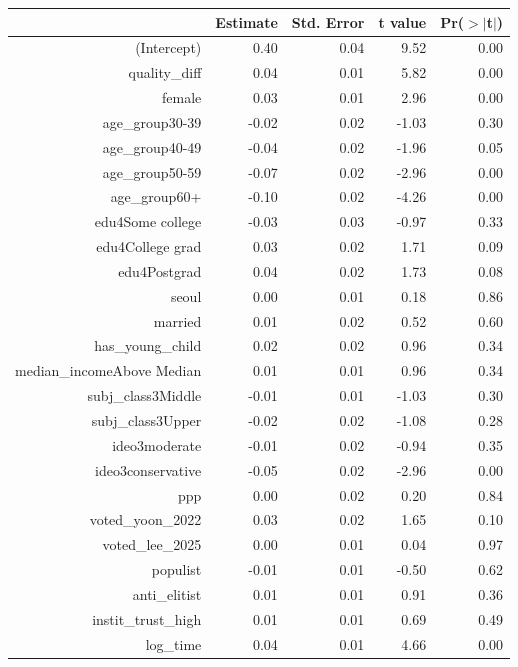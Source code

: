 \begin{tabular}{rrrrr}
  \toprule
 & Estimate & Std. Error & t value & Pr($>$$|$t$|$) \\ 
  \midrule
(Intercept) & 0.40 & 0.04 & 9.52 & 0.00 \\ 
  quality\_diff & 0.04 & 0.01 & 5.82 & 0.00 \\ 
  female & 0.03 & 0.01 & 2.96 & 0.00 \\ 
  age\_group30-39 & -0.02 & 0.02 & -1.03 & 0.30 \\ 
  age\_group40-49 & -0.04 & 0.02 & -1.96 & 0.05 \\ 
  age\_group50-59 & -0.07 & 0.02 & -2.96 & 0.00 \\ 
  age\_group60+ & -0.10 & 0.02 & -4.26 & 0.00 \\ 
  edu4Some college & -0.03 & 0.03 & -0.97 & 0.33 \\ 
  edu4College grad & 0.03 & 0.02 & 1.71 & 0.09 \\ 
  edu4Postgrad & 0.04 & 0.02 & 1.73 & 0.08 \\ 
  seoul & 0.00 & 0.01 & 0.18 & 0.86 \\ 
  married & 0.01 & 0.02 & 0.52 & 0.60 \\ 
  has\_young\_child & 0.02 & 0.02 & 0.96 & 0.34 \\ 
  median\_incomeAbove Median & 0.01 & 0.01 & 0.96 & 0.34 \\ 
  subj\_class3Middle & -0.01 & 0.01 & -1.03 & 0.30 \\ 
  subj\_class3Upper & -0.02 & 0.02 & -1.08 & 0.28 \\ 
  ideo3moderate & -0.01 & 0.02 & -0.94 & 0.35 \\ 
  ideo3conservative & -0.05 & 0.02 & -2.96 & 0.00 \\ 
  ppp & 0.00 & 0.02 & 0.20 & 0.84 \\ 
  voted\_yoon\_2022 & 0.03 & 0.02 & 1.65 & 0.10 \\ 
  voted\_lee\_2025 & 0.00 & 0.01 & 0.04 & 0.97 \\ 
  populist & -0.01 & 0.01 & -0.50 & 0.62 \\ 
  anti\_elitist & 0.01 & 0.01 & 0.91 & 0.36 \\ 
  instit\_trust\_high & 0.01 & 0.01 & 0.69 & 0.49 \\ 
  log\_time & 0.04 & 0.01 & 4.66 & 0.00 \\ 
   \bottomrule
\end{tabular}
